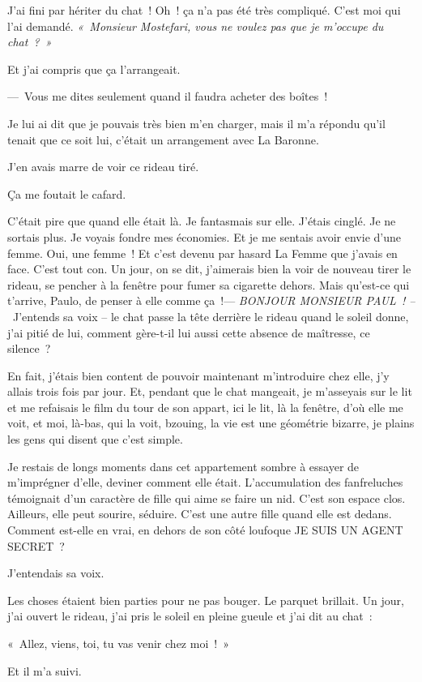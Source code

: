 \documentclass[twoside]{book} %
\begin{document}
\noindent J’ai fini par hériter du chat ! Oh ! ça n’a pas été très compliqué. C’est moi qui l’ai demandé. \emph{« Monsieur Mostefari, vous ne voulez pas que je m’occupe du chat ? »}\par
Et j’ai compris que ça l’arrangeait.\par
— Vous me dites seulement quand il faudra acheter des boîtes !\par
Je lui ai dit que je pouvais très bien m’en charger, mais il m’a répondu qu’il tenait que ce soit lui, c’était un arrangement avec La Baronne.\par
J’en avais marre de voir ce rideau tiré.\par
Ça me foutait le cafard.\par
C’était pire que quand elle était là. Je fantasmais sur elle. J’étais cinglé. Je ne sortais plus. Je voyais fondre mes économies. Et je me sentais avoir envie d’une femme. Oui, une femme ! Et c’est devenu par hasard La Femme que j’avais en face. C’est tout con. Un jour, on se dit, j’aimerais bien la voir de nouveau tirer le rideau, se pencher à la fenêtre pour fumer sa cigarette dehors. Mais qu’est-ce qui t’arrive, Paulo, de penser à elle comme ça !— \emph{BONJOUR MONSIEUR PAUL ! –} J’entends sa voix – le chat passe la tête derrière le rideau quand le soleil donne, j’ai pitié de lui, comment gère-t-il lui aussi cette absence de maîtresse, ce silence ?\par
En fait, j’étais bien content de pouvoir maintenant m’introduire chez elle, j’y allais trois fois par jour. Et, pendant que le chat mangeait, je m’asseyais sur le lit et me refaisais le film du tour de son appart, ici le lit, là la fenêtre, d’où elle me voit, et moi, là-bas, qui la voit, bzouing, la vie est une géométrie bizarre, je plains les gens qui disent que c’est simple.\par
Je restais de longs moments dans cet appartement sombre à essayer de m’imprégner d’elle, deviner comment elle était. L’accumulation des fanfreluches témoignait d’un caractère de fille qui aime se faire un nid. C’est son espace clos. Ailleurs, elle peut sourire, séduire. C’est une autre fille quand elle est dedans. Comment est-elle en vrai, en dehors de son côté loufoque JE SUIS UN AGENT SECRET ?\par
J’entendais sa voix.\par
Les choses étaient bien parties pour ne pas bouger. Le parquet brillait. Un jour, j’ai ouvert le rideau, j’ai pris le soleil en pleine gueule et j’ai dit au chat :\par
« Allez, viens, toi, tu vas venir chez moi ! »\par
Et il m’a suivi.
\end{document}
